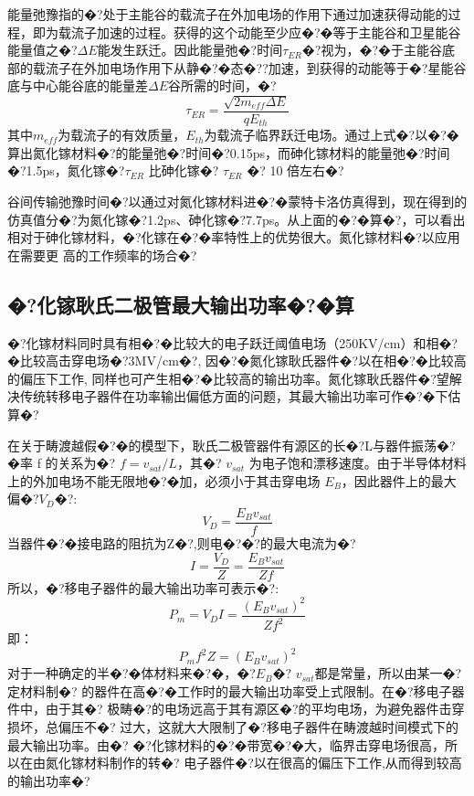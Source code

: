 \documentclass{zjureport}
\begin{document}
能量弛豫指的�?处于主能谷的载流子在外加电场的作用下通过加速获得动能的过程，即为载流子加速的过程。获得的这个动能至少应�?�等于主能谷和卫星能谷能量值之�?$\Delta E$能发生跃迁。因此能量弛�?时间$\tau_{ER}$�?视为，�?�于主能谷底部的载流子在外加电场作用下从静�?�态�??加速，到获得的动能等于�?星能谷底与中心能谷底的能量差$\Delta E$谷所需的时间，�?
 \begin{equation}
	 \tau_{ER}=\frac{\sqrt{2m_{eff}\Delta E}}{qE_{th}}
 \end{equation}
 其中$m_{eff}$为载流子的有效质量，$E_{th}$为载流子临界跃迁电场。通过上式�?以�?�算出氮化镓材料�?的能量弛�?时间�?0.15ps，而砷化镓材料的能量弛�?时间�?1.5ps，氮化镓�?$\tau_{ER}$ 比砷化镓�? $\tau_{ER}$ �? 10 倍左右�?
 
 谷间传输弛豫时间�?以通过对氮化镓材料进�?�蒙特卡洛仿真得到，现在得到的仿真值分�?为氮化镓�?1.2ps、砷化镓�?7.7ps。从上面的�?�算�?，可以看出相对于砷化镓材料，�?化镓在�?�率特性上的优势很大。氮化镓材料�?以应用在需要更
 高的工作频率的场合�?

\subsection{�?化镓耿氏二极管最大输出功率�?�算} 
�?化镓材料同时具有相�?�比较大的电子跃迁阈值电场（250KV/cm）和相�?�比较高击穿电场�?3MV/cm�?, 因�?�氮化镓耿氏器件�?以在相�?�比较高的偏压下工作, 同样也可产生相�?�比较高的输出功率。氮化镓耿氏器件�?望解决传统转移电子器件在功率输出偏低方面的问题，其最大输出功率可作�?�下估算�?

在关于畴渡越假�?�的模型下，耿氏二极管器件有源区的长�?L与器件振荡�?�率 f 的关系为�? $f=v_{sat}/L$，其�? $v_{sat}$ 为电子饱和漂移速度。由于半导体材料上的外加电场不能无限地�?�加，必须小于其击穿电场 $E_{B}$，因此器件上的最大偏�?$V_{D}$�?:
\begin{equation}
	V_{D}=\frac{E_{B}v_{sat}}{f}
\end{equation}
当器件�?�接电路的阻抗为Z�?,则电�?�?的最大电流为�?
\begin{equation}
	I=\frac{V_{D}}{Z}=\frac{E_{B}v_{sat}}{Zf}
\end{equation}
所以，�?移电子器件的最大输出功率可表示�?:
\begin{equation}
	P_{m}=V_{D}I=\frac{(E_{B}v_{sat})^{2}}{Zf^{2}}
\end{equation}
即：
\begin{equation}
	P_mf^{2}Z=(E_{B}v_{sat})^{2}
\end{equation}
对于一种确定的半�?�体材料来�?�，�?$E_{B}$�? $v_{sat}$都是常量，所以由某一�?定材料制�?
的器件在高�?�工作时的最大输出功率受上式限制。在�?移电子器件中，由于其�?
极畴�?的电场远高于其有源区�?的平均电场，为避免器件击穿损坏，总偏压不�?
过大，这就大大限制了�?移电子器件在畴渡越时间模式下的最大输出功率。由�?
�?化镓材料的�?�带宽�?�大，临界击穿电场很高，所以在由氮化镓材料制作的转�?
电子器件�?以在很高的偏压下工作,从而得到较高的输出功率�?
\end{document}

